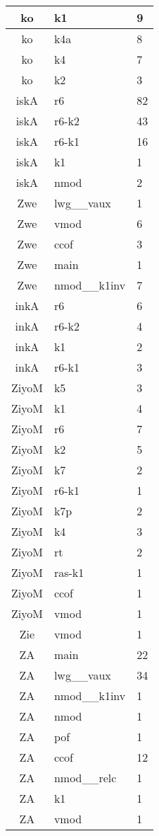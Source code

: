 \documentclass[a4 paper]{article}
\begin{document}
\begin{longtable}{cp{}p{}}
ko & k1 & 9\\ \midrule ko & k4a & 8\\ \midrule ko & k4 & 7\\ \midrule ko & k2 & 3\\ \midrule 
iskA & r6 & 82\\ \midrule iskA & r6-k2 & 43\\ \midrule iskA & r6-k1 & 16\\ \midrule iskA & k1 & 1\\ \midrule iskA & nmod & 2\\ \midrule 
Zwe & lwg\_\_vaux & 1\\ \midrule Zwe & vmod & 6\\ \midrule Zwe & ccof & 3\\ \midrule Zwe & main & 1\\ \midrule Zwe & nmod\_\_k1inv & 7\\ \midrule 
inkA & r6 & 6\\ \midrule inkA & r6-k2 & 4\\ \midrule inkA & k1 & 2\\ \midrule inkA & r6-k1 & 3\\ \midrule 
ZiyoM & k5 & 3\\ \midrule ZiyoM & k1 & 4\\ \midrule ZiyoM & r6 & 7\\ \midrule ZiyoM & k2 & 5\\ \midrule ZiyoM & k7 & 2\\ \midrule ZiyoM & r6-k1 & 1\\ \midrule ZiyoM & k7p & 2\\ \midrule ZiyoM & k4 & 3\\ \midrule ZiyoM & rt & 2\\ \midrule ZiyoM & ras-k1 & 1\\ \midrule ZiyoM & ccof & 1\\ \midrule ZiyoM & vmod & 1\\ \midrule 
Zie & vmod & 1\\ \midrule 
ZA & main & 22\\ \midrule ZA & lwg\_\_vaux & 34\\ \midrule ZA & nmod\_\_k1inv & 1\\ \midrule ZA & nmod & 1\\ \midrule ZA & pof & 1\\ \midrule ZA & ccof & 12\\ \midrule ZA & nmod\_\_relc & 1\\ \midrule ZA & k1 & 1\\ \midrule ZA & vmod & 1\\ \midrule 

\end{longtable}
\end{document}
